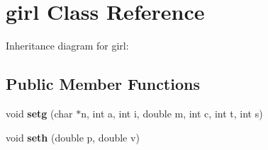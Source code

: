 \hypertarget{classgirl}{}\section{girl Class Reference}
\label{classgirl}


Inheritance diagram for girl\+:
\subsection*{Public Member Functions}
\begin{DoxyCompactItemize}
\item 
void {\bfseries setg} (char $\ast$n, int a, int i, double m, int c, int t, int s)\hypertarget{classgirl_ac66fe31f49767d76f2d36f8d43329e99}{}\label{classgirl_ac66fe31f49767d76f2d36f8d43329e99}

\item 
void {\bfseries seth} (double p, double v)\hypertarget{classgirl_a897cef30c5d8e10d4844ccc217400a3b}{}\label{classgirl_a897cef30c5d8e10d4844ccc217400a3b}

\end{DoxyCompactItemize}
